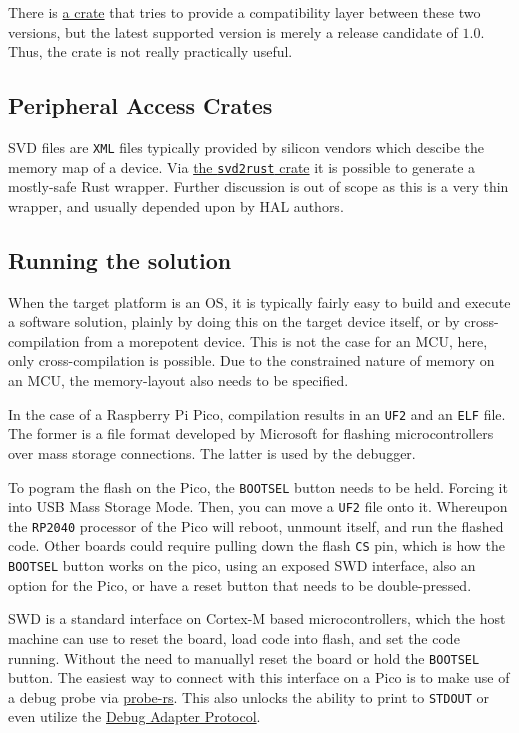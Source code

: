There is \href{https://github.com/ryankurte/embedded-hal-compat}{a crate} that tries to provide a compatibility layer between these two versions, but the latest supported version is merely a release candidate of $1.0$. Thus, the crate is not really practically useful.

\subsection{Peripheral Access Crates}

\gls{SVD} files are \texttt{XML} files typically provided by silicon vendors which descibe the memory map of a device. Via \href{https://crates.io/crates/svd2rust}{the \texttt{svd2rust} crate} it is possible to generate a mostly-safe Rust wrapper. Further discussion is out of scope as this is a very thin wrapper, and usually depended upon by \gls{HAL} authors.

\subsection{Running the solution}
\label{sec:running}

When the target platform is an \gls{OS}, it is typically fairly easy to build and execute a software solution, plainly by doing this on the target device itself, or by cross-compilation from a morepotent device. This is not the case for an \gls{MCU}, here, only cross-compilation is possible. Due to the constrained nature of memory on an \gls{MCU}, the memory-layout also needs to be specified.

In the case of a Raspberry Pi Pico, compilation results in an \texttt{UF2} and an \texttt{ELF} file. The former is a file format developed by Microsoft for flashing microcontrollers over mass storage connections. The latter is used by the debugger.

To pogram the flash on the Pico, the \texttt{BOOTSEL} button needs to be held. Forcing it into USB Mass Storage Mode. Then, you can move a \texttt{UF2} file onto it. Whereupon the \texttt{RP2040} processor of the Pico will reboot, unmount itself, and run the flashed code. Other boards could require pulling down the flash \texttt{CS} pin, which is how the \texttt{BOOTSEL} button works on the pico, using an exposed \gls{SWD} interface, also an option for the Pico, or have a reset button that needs to be double-pressed.

\gls{SWD} is a standard interface on Cortex-M based microcontrollers, which the host machine can use to reset the board, load code into flash, and set the code running. Without the need to manuallyl reset the board or hold the \texttt{BOOTSEL} button. The easiest way to connect with this interface on a Pico is to make use of a debug probe via \href{https://probe.rs/}{probe-rs}. This also unlocks the ability to print to \texttt{STDOUT} or even utilize the \href{https://microsoft.github.io/debug-adapter-protocol/overview}{Debug Adapter Protocol}.

